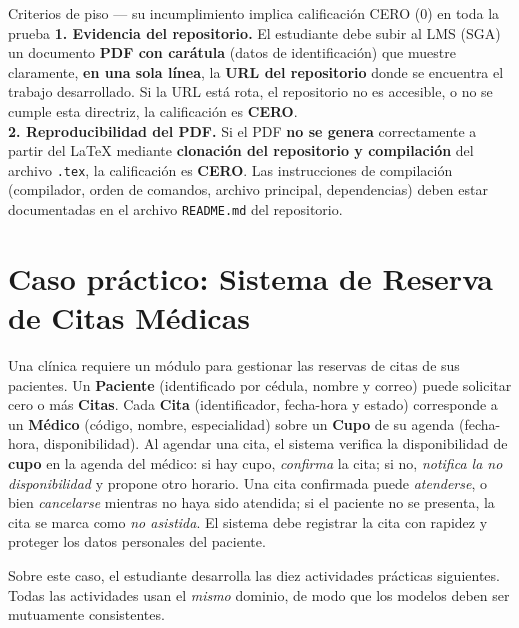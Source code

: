 \documentclass[11pt,a4paper,oneside]{article}
\begin{document}
\begin{piso}{Criterios de piso --- su incumplimiento implica calificaci\'on CERO (0) en toda la prueba}
\textbf{1. Evidencia del repositorio.} El estudiante debe subir al LMS (SGA) un documento \textbf{PDF con car\'atula} (datos de identificaci\'on) que muestre claramente, \textbf{en una sola l\'inea}, la \textbf{URL del repositorio} donde se encuentra el trabajo desarrollado. Si la URL est\'a rota, el repositorio no es accesible, o no se cumple esta directriz, la calificaci\'on es \textbf{CERO}.\\[3pt]
\textbf{2. Reproducibilidad del PDF.} Si el PDF \textbf{no se genera} correctamente a partir del LaTeX mediante \textbf{clonaci\'on del repositorio y compilaci\'on} del archivo \texttt{.tex}, la calificaci\'on es \textbf{CERO}. Las instrucciones de compilaci\'on (compilador, orden de comandos, archivo principal, dependencias) deben estar documentadas en el archivo \texttt{README.md} del repositorio.
\end{piso}

\section{Caso pr\'actico: Sistema de Reserva de Citas M\'edicas}

Una cl\'inica requiere un m\'odulo para gestionar las reservas de citas de sus pacientes. Un \textbf{Paciente} (identificado por c\'edula, nombre y correo) puede solicitar cero o m\'as \textbf{Citas}. Cada \textbf{Cita} (identificador, fecha-hora y estado) corresponde a un \textbf{M\'edico} (c\'odigo, nombre, especialidad) sobre un \textbf{Cupo} de su agenda (fecha-hora, disponibilidad). Al agendar una cita, el sistema verifica la disponibilidad de \textbf{cupo} en la agenda del m\'edico: si hay cupo, \emph{confirma} la cita; si no, \emph{notifica la no disponibilidad} y propone otro horario. Una cita confirmada puede \emph{atenderse}, o bien \emph{cancelarse} mientras no haya sido atendida; si el paciente no se presenta, la cita se marca como \emph{no asistida}. El sistema debe registrar la cita con rapidez y proteger los datos personales del paciente.

Sobre este caso, el estudiante desarrolla las diez actividades pr\'acticas siguientes. Todas las actividades usan el \emph{mismo} dominio, de modo que los modelos deben ser mutuamente consistentes.
\end{document}
